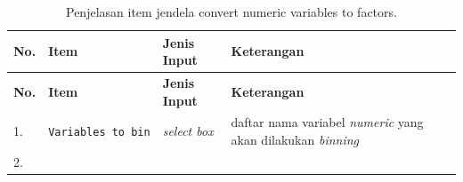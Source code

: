 \documentclass[12pt,]{krantz}
\begin{document}
\begin{longtable}[]{@{}llll@{}}
\caption{\label{tab:binvartab} Penjelasan item jendela convert numeric variables to factors.}\tabularnewline
\toprule
\begin{minipage}[b]{0.04\columnwidth}\raggedright
\textbf{No.}\strut
\end{minipage} & \begin{minipage}[b]{0.14\columnwidth}\raggedright
\textbf{Item}\strut
\end{minipage} & \begin{minipage}[b]{0.09\columnwidth}\raggedright
\textbf{Jenis Input}\strut
\end{minipage} & \begin{minipage}[b]{0.61\columnwidth}\raggedright
\textbf{Keterangan}\strut
\end{minipage}\tabularnewline
\midrule
\endfirsthead
\toprule
\begin{minipage}[b]{0.04\columnwidth}\raggedright
\textbf{No.}\strut
\end{minipage} & \begin{minipage}[b]{0.14\columnwidth}\raggedright
\textbf{Item}\strut
\end{minipage} & \begin{minipage}[b]{0.09\columnwidth}\raggedright
\textbf{Jenis Input}\strut
\end{minipage} & \begin{minipage}[b]{0.61\columnwidth}\raggedright
\textbf{Keterangan}\strut
\end{minipage}\tabularnewline
\midrule
\endhead
\begin{minipage}[t]{0.04\columnwidth}\raggedright
1.\strut
\end{minipage} & \begin{minipage}[t]{0.14\columnwidth}\raggedright
\texttt{Variables\ to\ bin}\strut
\end{minipage} & \begin{minipage}[t]{0.09\columnwidth}\raggedright
\emph{select box}\strut
\end{minipage} & \begin{minipage}[t]{0.61\columnwidth}\raggedright
daftar nama variabel \emph{numeric} yang akan dilakukan \emph{binning}\strut
\end{minipage}\tabularnewline
\begin{minipage}[t]{0.04\columnwidth}\raggedright
2.\strut
\end{minipage} & \begin{minipage}[t]{0.14\columnwidth}\raggedright

\end{minipage}
\end{longtable}
\end{document}
